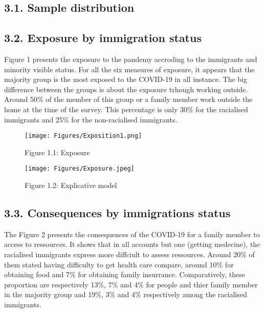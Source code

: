\documentclass[
]{article}
\begin{document}
\hypertarget{sample-distribution}{%
\subsection{3.1. Sample distribution}\label{sample-distribution}}

\hypertarget{exposure-by-immigration-status}{%
\subsection{3.2. Exposure by immigration status}\label{exposure-by-immigration-status}}

Figure 1 presents the exposure to the pandemy accroding to the immigrants and
minority visible status. For all the six measures of exposure, it appears that
the majority group is the most exposed to the COVID-19 in all instance. The big
difference between the groups is about the exposure trhough working outside.
Around 50\% of the member of this group or a family member work outside the home
at the time of the survey. This percentage is only 30\% for the racialised
immigrants and 25\% for the non-racialised immigrants.

\begin{figure}
\centering
\texttt{[image: Figures/Exposition1.png]}
\caption{Figure 1.1: Exposure}
\end{figure}

\begin{figure}
\centering
\texttt{[image: Figures/Exposure.jpeg]}
\caption{Figure 1.2: Explicative model}
\end{figure}

\hypertarget{consequences-by-immigrations-status}{%
\subsection{3.3. Consequences by immigrations status}\label{consequences-by-immigrations-status}}

The Figure 2 presents the consequences of the COVID-19 for a family member to
access to ressources. It shows that in all accounts but one (getting medecine),
the racialised immigrants express more diffciult to assess ressources. Around
20\% of them stated having difficulty to get health care compare, around 10\% for
obtaining food and 7\% for obtaining family insurrance. Comparatively, these
proportion are respectively 13\%, 7\% and 4\% for people and thier family member in
the majority group and 19\%, 3\% and 4\% respectively among the racialised
immigrants.
\end{document}
